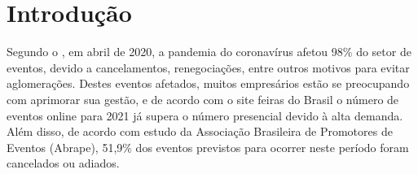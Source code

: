 \chapter{Introdução}
\label{chp:LABEL_CHP_1}


Segundo o , em abril de 2020, a pandemia do coronavírus afetou 98\% do setor de eventos, devido a cancelamentos, renegociações, entre outros motivos para evitar aglomerações. Destes eventos afetados, muitos empresários estão se preocupando com aprimorar sua gestão, e de acordo com o site feiras do Brasil  o número de eventos online para 2021 já supera o número presencial devido à alta demanda. Além disso, de acordo com estudo da Associação Brasileira de Promotores de Eventos (Abrape), 51,9\% dos eventos previstos para ocorrer neste período foram cancelados ou adiados.

